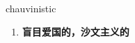 
\begin{frame}
{\huge chauvinistic}
\begin{center}
\begin{enumerate}\Large
  \item \textbf{盲目爱国的，沙文主义的}
\end{enumerate}
\end{center}
\end{frame}
